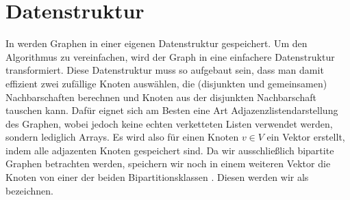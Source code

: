 \section{Datenstruktur}
In \nk {} werden Graphen in einer eigenen Datenstruktur gespeichert. Um den Algorithmus 
zu vereinfachen, wird der Graph in eine einfachere Datenstruktur transformiert.
Diese Datenstruktur muss so aufgebaut sein, dass man damit effizient zwei zufällige
Knoten auswählen, die (disjunkten und gemeinsamen) Nachbarschaften berechnen und Knoten aus der
disjunkten Nachbarschaft tauschen kann. Dafür eignet sich am Besten  
eine Art Adjazenzlistendarstellung des Graphen, wobei jedoch keine echten verketteten
Listen verwendet werden, sondern lediglich Arrays. 
Es wird also für einen Knoten
$v \in V$ ein Vektor erstellt, indem alle adjazenten Knoten gespeichert sind.
Da wir ausschließlich bipartite Graphen betrachten werden, speichern wir noch in 
einem weiteren Vektor die Knoten von einer der beiden Bipartitionsklassen . Diesen
werden wir als \red{\fett{\partvek}} bezeichnen.




